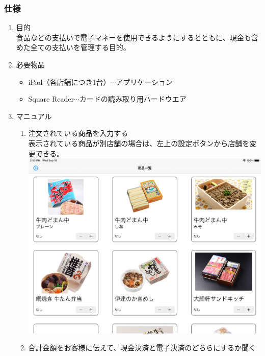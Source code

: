 \documentclass[a4paper]{ltjsreport}
\begin{document}
\subsubsection{仕様}
\begin{enumerate}
  \item 目的\\
        食品などの支払いで電子マネーを使用できるようにするとともに、現金も含めた全ての支払いを管理する目的。
  \item 必要物品
        \begin{itemize}
          \item iPad（各店舗につき1台）$\cdots$アプリケーション
          \item Square Reader$\cdots$カードの読み取り用ハードウエア
        \end{itemize}
  \item マニュアル
        \begin{enumerate}
          \item 注文されている商品を入力する\\
                表示されている商品が別店舗の場合は、左上の設定ボタンから店舗を変更できる。\\
                \includegraphics[scale=0.15]{assets/square_top-interface.png}
          \item 合計金額をお客様に伝えて、現金決済と電子決済のどちらにするか聞く\\

\end{enumerate}
\end{enumerate}
\end{document}
